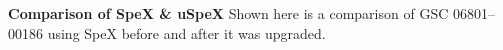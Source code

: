 {\bf Comparison of SpeX \& uSpeX} Shown here is a comparison of GSC 06801--00186 using SpeX before and after it was upgraded.~\label{fig:uSpex-Spex}